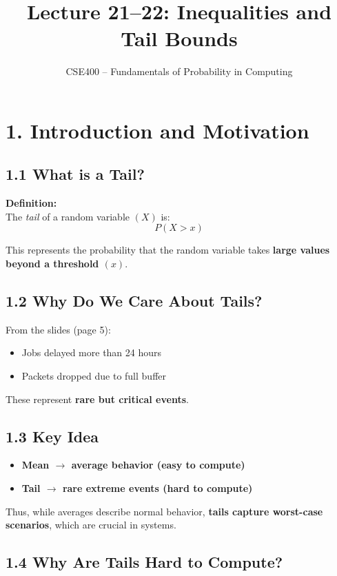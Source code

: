 \documentclass[12pt]{article}
\title{Lecture 21--22: Inequalities and Tail Bounds}
\author{CSE400 -- Fundamentals of Probability in Computing}
\date{}
\begin{document}
\maketitle

\section*{1. Introduction and Motivation}

\subsection*{1.1 What is a Tail?}

\textbf{Definition:} \\
The \textit{tail} of a random variable $(X)$ is:
\[
P(X > x)
\]

This represents the probability that the random variable takes \textbf{large values beyond a threshold $(x)$}. 

\subsection*{1.2 Why Do We Care About Tails?}

From the slides (page 5):

\begin{itemize}
\item Jobs delayed more than 24 hours
\item Packets dropped due to full buffer
\end{itemize}

These represent \textbf{rare but critical events}.

\subsection*{1.3 Key Idea}

\begin{itemize}
\item \textbf{Mean $\rightarrow$ average behavior (easy to compute)}
\item \textbf{Tail $\rightarrow$ rare extreme events (hard to compute)} 
\end{itemize}

Thus, while averages describe normal behavior, \textbf{tails capture worst-case scenarios}, which are crucial in systems.

\subsection*{1.4 Why Are Tails Hard to Compute?}
\end{document}
